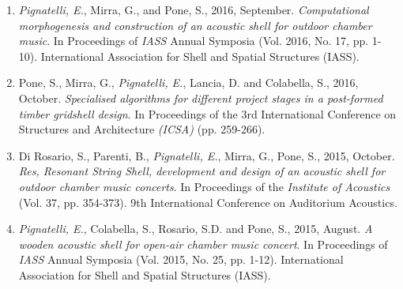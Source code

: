 \begin{publications}
\begin{enumerate}[leftmargin=0.45cm, itemsep=0em, topsep=0.5em, parsep=0.2em]
        \item \emph{Pignatelli, E.}, Mirra, G., and Pone, S., 2016, September. \textit{Computational morphogenesis and construction of an acoustic shell for outdoor chamber music}. In Proceedings of \emph{IASS} Annual Symposia (Vol. 2016, No. 17, pp. 1-10). International Association for Shell and Spatial Structures (IASS).
        \item Pone, S., Mirra, G., \emph{Pignatelli, E.}, Lancia, D. and Colabella, S., 2016, October. \textit{Specialised algorithms for different project stages in a post-formed timber gridshell design}. In Proceedings of the 3rd International Conference on Structures and Architecture \emph{(ICSA)} (pp. 259-266).
        \item Di Rosario, S., Parenti, B., \emph{Pignatelli, E.}, Mirra, G., Pone, S., 2015, October. \textit{Res, Resonant String Shell, development and design of an acoustic shell for outdoor chamber music concerts}. In Proceedings of the \emph{Institute of Acoustics} (Vol. 37, pp. 354-373). 9th International Conference on Auditorium Acoustics.
        \item \emph{Pignatelli, E.}, Colabella, S., Rosario, S.D. and Pone, S., 2015, August. \textit{A wooden acoustic shell for open-air chamber music concert}. In Proceedings of \emph{IASS} Annual Symposia (Vol. 2015, No. 25, pp. 1-12). International Association for Shell and Spatial Structures (IASS).
    \end{enumerate}
\end{publications}
